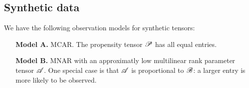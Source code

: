 \documentclass{article}
\newcommand{\T}[2][]{#1\mathscr{\MakeUppercase{#2}}}
\theoremstyle{plain}
\begin{document}
\subsection{Synthetic data}
\label{sec:experiments-synthetic}
We have the following observation models for synthetic tensors:
\begin{itemize}[leftmargin=5em,topsep=0pt,partopsep=1ex,parsep=0ex]
	\item[\textbf{Model A.}]
	\label{obs:syn-mcar}
	MCAR. The propensity tensor $\T{P}$ has all equal entries.
	\item[\textbf{Model B.}]
	\label{obs:syn-mnar-product}
	MNAR with an approximatly low multilinear rank parameter tensor $\T{A}$. 
	One special case is that $\T{A}$ is proportional to $\T{B}$: a larger entry is more likely to be observed.
\end{itemize}
\end{document}

